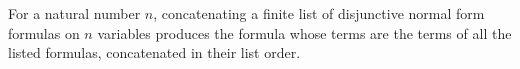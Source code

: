 \begin{definition}
\label{LMN.dnfConcat}
\leanok
{}
For a natural number $n$, concatenating a finite list of disjunctive normal form
formulas on $n$ variables produces the formula whose terms are the terms of all the
listed formulas, concatenated in their list order.
\end{definition}
